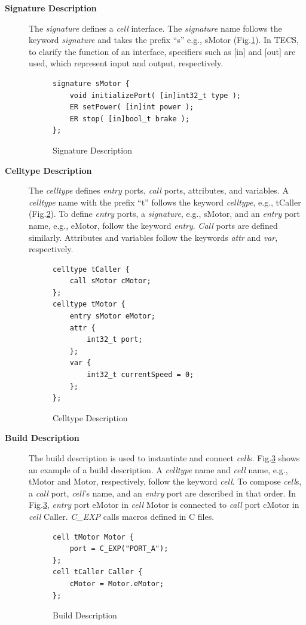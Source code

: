 \documentclass[a4j,12pt,oneside,openany,english]{jsbook}
\begin{document}
\begin{description}
    \item[{\bf Signature Description}]
        The {\it signature} defines a {\it cell} interface.
        The {\it signature} name follows the keyword {\it signature} and takes the prefix ``s'' e.g., sMotor (Fig.\ref{signature}).
        In TECS, to clarify the function of an interface, specifiers such as [in] and [out] are used, which represent input and output, respectively.
\begin{figure}[t]
\centering
\begin{lstlisting}
signature sMotor {
    void initializePort( [in]int32_t type );
    ER setPower( [in]int power );
    ER stop( [in]bool_t brake );
};
\end{lstlisting}
\caption{Signature Description}
\label{signature}
\end{figure}
    \item[{\bf Celltype Description}]
        The {\it celltype} defines {\it entry} ports, {\it call} ports, attributes, and variables.
        A {\it celltype} name with the prefix ``t'' follows the keyword {\it celltype}, e.g., tCaller (Fig.\ref{celltype}).
        To define {\it entry} ports, a {\it signature}, e.g., sMotor, and an {\it entry} port name, e.g., eMotor, follow the keyword {\it entry}.
        {\it Call} ports are defined similarly.
        Attributes and variables follow the keywords {\it attr} and {\it var}, respectively.
\begin{figure}[t]
\centering
\begin{lstlisting}
celltype tCaller {
    call sMotor cMotor;
};
celltype tMotor {
    entry sMotor eMotor;
    attr {
        int32_t port;
    };
    var {
        int32_t currentSpeed = 0;
    };
};
\end{lstlisting}
\caption{Celltype Description}
\label{celltype}
\end{figure}
    \item[{\bf Build Description}]
        The build description is used to instantiate and connect {\it cell}s.
        Fig.\ref{build} shows an example of a build description.
        A {\it celltype} name and {\it cell} name, e.g., tMotor and Motor, respectively, follow the keyword {\it cell}.
        To compose {\it cell}s, a {\it call} port, {\it cell}'s name, and an {\it entry} port are described in that order.
        In Fig.\ref{build}, {\it entry} port eMotor in {\it cell} Motor is connected to {\it call} port cMotor in {\it cell} Caller.
        {\it C\_EXP} calls macros defined in C files.

\begin{figure}[t]
\centering
\begin{lstlisting}
cell tMotor Motor {
    port = C_EXP("PORT_A");
};
cell tCaller Caller {
    cMotor = Motor.eMotor;
};
\end{lstlisting}
\caption{Build Description}
\label{build}
\end{figure}

\end{description}
\end{document}
